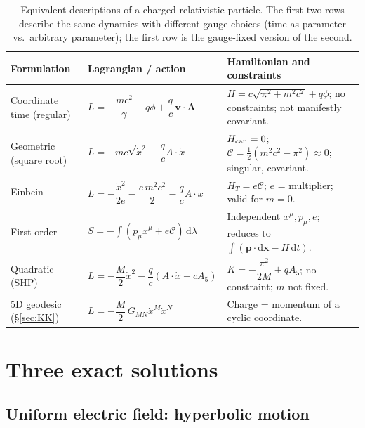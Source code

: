 \documentclass[11pt,a4paper]{book}
\numberwithin{equation}{section}
\newcommand{\dd}{\mathrm{d}}
\newcommand{\Cc}{\mathcal{C}}          %
\newcommand{\bx}{\mathbf{x}}
\newcommand{\bv}{\mathbf{v}}
\newcommand{\bp}{\mathbf{p}}
\newcommand{\bA}{\mathbf{A}}
\newcommand{\bpi}{\boldsymbol{\pi}}
\theoremstyle{definition}
\theoremstyle{remark}
\begin{document}
\begin{table}[H]
\centering\small
\renewcommand{\arraystretch}{1.5}
\begin{tabular}{@{}>{\raggedright\arraybackslash}p{2.7cm}>{\raggedright\arraybackslash}p{6.2cm}>{\raggedright\arraybackslash}p{5.7cm}@{}}
\toprule
Formulation & Lagrangian / action & Hamiltonian and constraints\\
\midrule
Coordinate time (regular)
 & $L=-\dfrac{mc^2}{\gamma}-q\phi+\dfrac qc\,\bv\!\cdot\!\bA$
 & $H=c\sqrt{\bpi^2+m^2c^2}+q\phi$; no constraints; not manifestly covariant.\\
Geometric (square root)
 & $L=-mc\sqrt{\dot x^2}-\dfrac qc A\!\cdot\!\dot x$
 & $H_{\rm can}=0$; $\Cc=\tfrac12(m^2c^2-\pi^2)\approx0$; singular, covariant.\\
Einbein
 & $L=-\dfrac{\dot x^2}{2e}-\dfrac{e\,m^2c^2}2-\dfrac qc A\!\cdot\!\dot x$
 & $H_T=e\Cc$; $e$ = multiplier; valid for $m=0$.\\
First-order
 & $S=-\!\int(p_\mu\dot x^\mu+e\Cc)\,\dd\lambda$
 & Independent $x^\mu,p_\mu,e$; reduces to $\int(\bp\!\cdot\!\dd\bx-H\,\dd t)$.\\
Quadratic (SHP)
 & $L=-\dfrac M2\dot x^2-\dfrac qc(A\!\cdot\!\dot x+cA_5)$
 & $K=-\dfrac{\pi^2}{2M}+qA_5$; no constraint; $m$ not fixed.\\
5D geodesic (\S\ref{sec:KK})
 & $L=-\dfrac M2\,G_{MN}\dot x^M\dot x^N$
 & Charge = momentum of a cyclic coordinate.\\
\bottomrule
\end{tabular}
\caption{Equivalent descriptions of a charged relativistic particle.  The
first two rows describe the same dynamics with different gauge choices
(time as parameter vs.\ arbitrary parameter); the first row is the gauge-fixed
version of the second.}
\label{tab:formulations}
\end{table}

\section{Three exact solutions}\label{sec:examples}

\subsection{Uniform electric field: hyperbolic motion}
\end{document}
